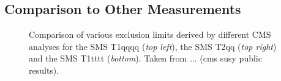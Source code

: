 \subsection{Comparison to Other Measurements}
\label{subsec:RA2_comp}

\begin{figure}[!t]
  \centering
{}

  \caption{Comparison of various exclusion limits derived by different CMS analyses for the SMS T1qqqq (\textit{top left}), the SMS T2qq (\textit{top right}) and the SMS T1tttt (\textit{bottom}). Taken from ... (cms susy public results).}
  \label{fig:result_comp}
\end{figure}

